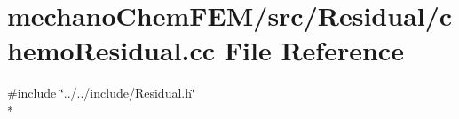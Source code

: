 \section{mechano\-Chem\-F\-E\-M/src/\-Residual/chemo\-Residual.cc File Reference}
\label{chemo_residual_8cc}
{\ttfamily \#include \char`\"{}../../include/\-Residual.\-h\char`\"{}}\\*
